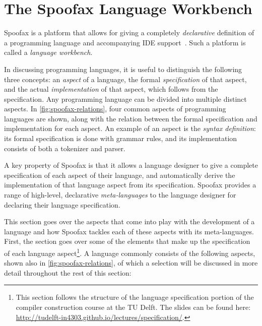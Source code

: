 \section{The Spoofax Language Workbench}
\label{sec:spoofax}
Spoofax is a platform that allows for giving a completely \emph{declarative}
definition of a programming language and accompanying IDE
support~\cite{Kats10a}. Such a platform is called a \emph{language workbench}.

In discussing programming languages, it is useful to distinguish the following
three concepts: an \textit{aspect} of a language, the formal
\textit{specification} of that aspect, and the actual \textit{implementation} of
that aspect, which follows from the specification. Any programming language can
be divided into multiple distinct aspects. In \cref{fig:spoofax-relations}, four
common aspects of programming languages are shown, along with the relation
between the formal specification and implementation for each aspect. An example
of an aspect is the \textit{syntax definition}: its formal specification is done
with grammar rules, and its implementation consists of both a tokenizer and
parser.

A key property of Spoofax is that it allows a language designer to give a
complete specification of each aspect of their language, and automatically
derive the implementation of that language aspect from its
specification. Spoofax provides a range of high-level, declarative
\textit{meta-languages} to the language designer for declaring their language
specification.

This section goes over the aspects that come into play with the development of a
language and how Spoofax tackles each of these aspects with its
meta-languages. First, the section goes over some of the elements that make up
the specification of each language aspect\footnote{This section follows the
  structure of the language specification portion of the compiler construction
  course at the TU Delft. The slides can be found here:
  \url{http://tudelft-in4303.github.io/lectures/specification/}.}. A language
commonly consists of the following aspects, shown also in
\cref{fig:spoofax-relations}, of which a selection will be discussed in more
detail throughout the rest of this section:

